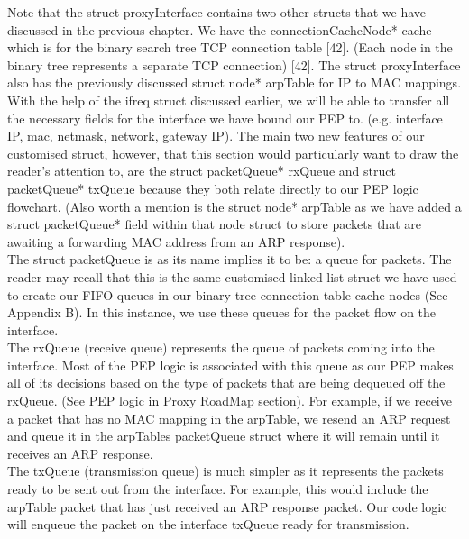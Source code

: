 \documentclass{uathesis}
\begin{document}
Note that the struct proxyInterface contains two other structs that we have discussed in the previous chapter. We have the connectionCacheNode* cache which is for the binary search tree TCP connection table [42]. (Each node in the binary tree represents a separate TCP connection) [42]. The struct proxyInterface also has the previously discussed struct node* arpTable for IP to MAC mappings.\\

With the help of the ifreq struct discussed earlier, we will be able to transfer all the necessary fields for the interface we have bound our PEP to. (e.g. interface IP, mac, netmask, network, gateway IP). The main two new features of our customised struct, however, that this section would particularly want to draw the reader's attention to, are the struct packetQueue* rxQueue and struct packetQueue* txQueue because they both relate directly to our PEP logic flowchart. (Also worth a mention is the struct node* arpTable as we have added a struct packetQueue* field within that node struct to store packets that are awaiting a forwarding MAC address from an ARP response).\\

The struct packetQueue is as its name implies it to be: a queue for packets. The reader may recall that this is the same customised linked list struct we have used to create our FIFO queues in our binary tree connection-table cache nodes (See Appendix B). In this instance, we use these queues for the packet flow on the interface.\\

The rxQueue (receive queue) represents the queue of packets coming into the interface. Most of the PEP logic is associated with this queue as our PEP makes all of its decisions based on the type of packets that are being dequeued off the rxQueue. (See PEP logic in Proxy RoadMap section). For example, if we receive a packet that has no MAC mapping in the arpTable, we resend an ARP request and queue it in the arpTables packetQueue struct where it will remain until it receives an ARP response.\\

The txQueue (transmission queue) is much simpler as it represents the packets ready to be sent out from the interface. For example, this would include the arpTable packet that has just received an ARP response packet. Our code logic will enqueue the packet on the interface txQueue ready for transmission.  \\
\end{document}
